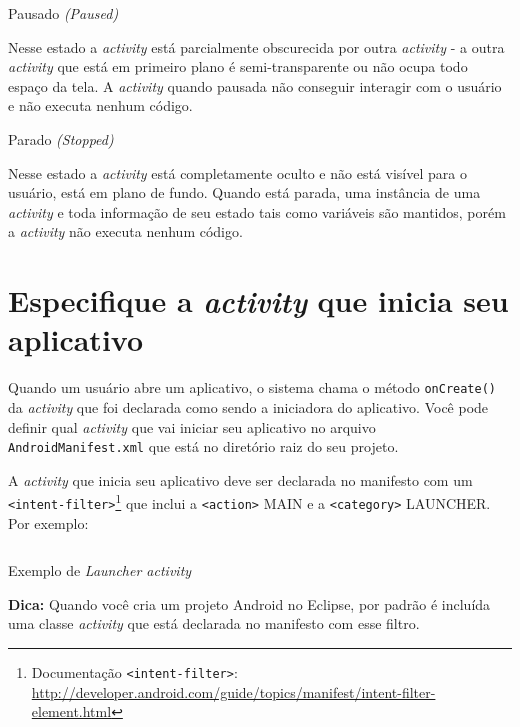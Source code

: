 \documentclass[a4paper,12pt,brazil,oneside]{book}
\begin{document}
Pausado \emph{(Paused)}
	
\hspace*{5mm} Nesse estado a \emph{activity} está parcialmente obscurecida por outra \emph{activity} - a outra \emph{activity} que está em primeiro plano é semi-transparente ou não ocupa todo espaço da tela. A \emph{activity} quando pausada não conseguir interagir com o usuário e não executa nenhum código.
	
Parado \emph{(Stopped)}
	
\hspace*{5mm} Nesse estado a \emph{activity} está completamente oculto e não está visível para o usuário, está em plano de fundo. Quando está parada, uma instância de uma \emph{activity} e toda informação de seu estado tais como variáveis são mantidos, porém a \emph{activity} não executa nenhum código.
	
\section{Especifique a \emph{activity} que inicia seu aplicativo}
\label{sec:especact}

Quando um usuário abre um aplicativo, o sistema chama o método \texttt{onCreate()} da \emph{activity} que foi declarada como sendo a iniciadora do aplicativo. Você pode definir qual \emph{activity} que vai iniciar seu aplicativo no arquivo \texttt{AndroidManifest.xml} que está no diretório raiz do seu projeto.

 A \emph{activity} que inicia seu aplicativo deve ser declarada no manifesto com um \texttt{<intent-filter>}\footnote{Documentação \texttt{<intent-filter>}: \href{http://developer.android.com/guide/topics/manifest/intent-filter-element.html}{http://developer.android.com/guide/topics/manifest/intent-filter-element.html}} que inclui a \texttt{<action>} MAIN e a \texttt{<category>} LAUNCHER. Por exemplo:
 
\begin{listing}[H]
\inputminted[linenos=true,fontsize=\small,frame=lines, framesep=2mm, tabsize=2,numbersep=5pt]{xml}{src/design/launcher-manifest.xml}
\caption{Exemplo de \emph{Launcher activity}}
\end{listing}

\begin{framed}
\textbf{Dica:} Quando você cria um projeto Android no Eclipse, por padrão é incluída uma classe \emph{activity} que está declarada no manifesto com esse filtro.
\end{framed}
\end{document}
